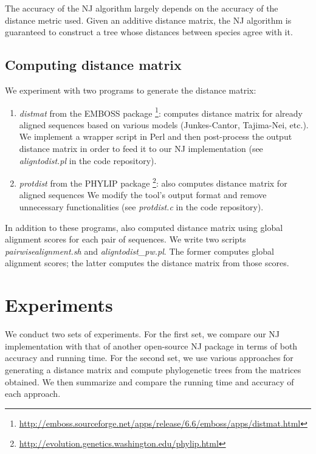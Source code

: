 \documentclass[11pt,letterpaper]{article}
\theoremstyle{definition}
\begin{document}
The accuracy of the NJ algorithm largely depends on the accuracy of the distance metric used. Given an additive distance matrix, the NJ algorithm is guaranteed to construct a tree whose distances between species agree with it. 

\subsection{Computing distance matrix}\label{distance}


We experiment with two programs to generate the distance matrix:
\begin{enumerate}
	\item \textit{distmat} from the EMBOSS package \cite{rice2000emboss}  \footnote{\url{http://emboss.sourceforge.net/apps/release/6.6/emboss/apps/distmat.html}}: computes distance matrix for already aligned sequences based on various models (Junkes-Cantor, Tajima-Nei, etc.). We implement a wrapper script in Perl and then post-process the output distance matrix in order to feed it to our NJ implementation (see \textit{aligntodist.pl} in the code repository).
        \item \textit{protdist} from the PHYLIP package \footnote{\url{http://evolution.genetics.washington.edu/phylip.html}}: also computes distance matrix for aligned sequences We modify the tool's output format and remove unnecessary functionalities (see \textit{protdist.c} in the code repository).
\end{enumerate}

In addition to these programs, also computed distance matrix using global alignment scores for each pair of sequences. We write two scripts \textit{pairwisealignment.sh} and \textit{aligntodist\_pw.pl}. The former computes global alignment scores; the latter computes the distance matrix from those scores.

\section{Experiments}

We conduct two sets of experiments. For the first set, we compare our NJ implementation with that of another open-source NJ package in terms of both accuracy and running time. For the second set, we use various approaches for generating a distance matrix and compute phylogenetic trees from the matrices obtained. We then summarize and compare the running time and accuracy of each approach. 
\end{document}
